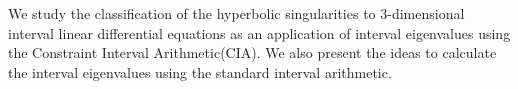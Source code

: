 
We study the classification of the hyperbolic singularities to 3-dimensional interval linear differential equations as an application of  interval eigenvalues using the Constraint Interval Arithmetic(CIA). We also present the ideas to calculate the interval eigenvalues using the standard interval arithmetic.


